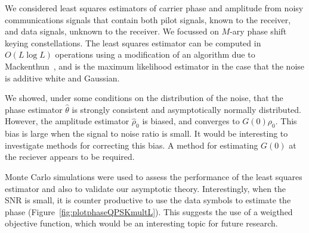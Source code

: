 \documentclass[journal]{IEEEtran}
\begin{document}
We considered least squares estimators of carrier phase and amplitude from noisy communications signals that contain both pilot signals, known to the receiver, and data signals, unknown to the receiver.  We focussed on $M$-ary phase shift keying constellations.  The least squares estimator can be computed in $O(L\log L)$ operations using a modification of an algorithm due to Mackenthun~\cite{Mackenthun1994}, and is the maximum likelihood estimator in the case that the noise is additive white and Gaussian.  

We showed, under some conditions on the distribution of the noise, that the phase estimator $\hat{\theta}$ is strongly consistent and asymptotically normally distributed.  However, the amplitude estimator $\hat{\rho}_0$ is biased, and converges to $G(0)\rho_0$.  This bias is large when the signal to noise ratio is small.  It would be interesting to investigate methods for correcting this bias.  A method for estimating $G(0)$ at the reciever appears to be required.

Monte Carlo simulations were used to assess the performance of the least squares estimator and also to validate our asymptotic theory.  Interestingly, when the SNR is small, it is counter productive to use the data symbols to estimate the phase (Figure~\ref{fig:plotphaseQPSKmultL}).  This suggests the use of a weigthed objective function, which would be an interesting topic for future research.

\small




 
\end{document}
